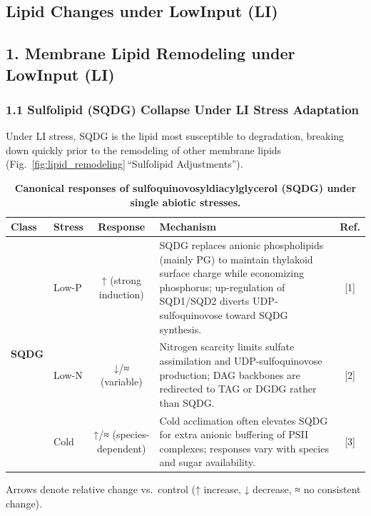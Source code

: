 \documentclass[10pt,letterpaper]{article}
\begin{document}
\subsection*{Lipid Changes under LowInput (LI)}

\subsection*{1. Membrane Lipid Remodeling under LowInput (LI)}

\subsubsection*{1.1 Sulfolipid (SQDG) Collapse Under LI Stress Adaptation}

Under LI stress, SQDG is the lipid most susceptible to degradation, breaking down quickly prior to the remodeling of other membrane lipids (Fig.~\ref{fig:lipid_remodeling}\,“Sulfolipid Adjustments”).


\begin{table}[!ht]
  \centering
  \caption{\bf Canonical responses of sulfoquinovosyldiacylglycerol (SQDG) under single abiotic stresses.}
  \label{table:SQDG_responses}
  \begin{tabular}{@{} l l c p{6cm} c @{}}
    \toprule
    \textbf{Class} 
      & \textbf{Stress} 
      & \textbf{Response} 
      & \textbf{Mechanism} 
      & \textbf{Ref.} \\
    \midrule
    \multirow{3}{*}{\textbf{SQDG}}
      & Low-P  & ↑ (strong induction)   
               & SQDG replaces anionic phospholipids (mainly PG) to maintain thylakoid surface charge while economizing phosphorus; up-regulation of SQD1/SQD2 diverts UDP-sulfoquinovose toward SQDG synthesis. 
               & [1] \\
      & Low-N  & ↓/≈ (variable)         
               & Nitrogen scarcity limits sulfate assimilation and UDP-sulfoquinovose production; DAG backbones are redirected to TAG or DGDG rather than SQDG. 
               & [2] \\
      & Cold   & ↑/≈ (species-dependent)
               & Cold acclimation often elevates SQDG for extra anionic buffering of PSII complexes; responses vary with species and sugar availability. 
               & [3] \\
    \bottomrule
  \end{tabular}
  \begin{flushleft}
    {\footnotesize Arrows denote relative change vs.\ control (↑ increase, ↓ decrease, ≈ no consistent change).}
  \end{flushleft}
\end{table}
\end{document}
